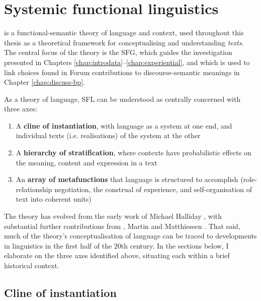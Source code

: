 
\section{Systemic functional linguistics} \label{sect:sfl}

 is a functional\hyp{}semantic theory of language and context, used throughout this thesis as a theoretical framework for conceptualising and understanding \emph{texts}. The central focus of the theory is the \gls{SFG}, which guides the investigation presented in Chapters \ref{chap:introdata}--\ref{chap:experiential}, and which is used to link  choices found in \gls{Forum} contributions to \gls{discourse-semantic} meanings in Chapter \ref{chap:discuss-bp}.

As a theory of language, \gls{SFL} can be understood as centrally concerned with three axes:

\begin{enumerate}
\item A \textbf{cline of instantiation}, with language as a system at one end, and individual texts (i.e. realisations) of the system at the other
\item A \textbf{hierarchy of stratification}, where contexts have probabilistic effects on the meaning, content and expression in a text
\item An \textbf{array of metafunctions} that language is structured to accomplish (role-relationship negotiation, the construal of experience, and self-organisation of text into coherent units)
\end{enumerate}
%
The theory has evolved from the early work of Michael Halliday \parencite*[e.g.][]{halliday_1966_deepgrammar,halliday1978language}, with substantial further contributions from \textcite[e.g.][]{hasan_structure_1985}, Martin \parencite*[e.g.][]{martin_english_1992} and Matthiessen \parencite*[e.g.][]{matthiessen_lexicogrammatical_1995}. That said, much of the theory's conceptualisation of language can be traced to developments in linguistics in the first half of the 20th century. In the sections below, I elaborate on the three axes identified above, situating each within a brief historical context.

\subsection{Cline of instantiation}

